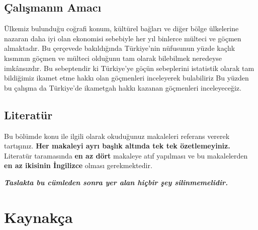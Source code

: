 \documentclass[
  12pt,
]{article}
\newlength{\cslhangindent}
\newlength{\cslentryspacingunit} %
\newenvironment{CSLReferences}[2] %
 {%
  \setlength{\parindent}{0pt}
  \ifodd #1
  \let\oldpar\par
  \def\par{\hangindent=\cslhangindent\oldpar}
  \fi
  \setlength{\parskip}{#2\cslentryspacingunit}
 }%
 {}
\begin{document}
\hypertarget{uxe7alux131ux15fmanux131n-amacux131}{%
\subsection{Çalışmanın Amacı}\label{uxe7alux131ux15fmanux131n-amacux131}}

Ülkemiz bulunduğu coğrafi konum, kültürel bağları ve diğer bölge ülkelerine nazaran daha
iyi olan ekonomisi sebebiyle her yıl binlerce mülteci ve göçmen almaktadır. Bu çerçevede
bakıldığında Türkiye'nin nüfusunun yüzde kaçlık kısmının göçmen ve mülteci olduğunu tam
olarak bilebilmek neredeyse imkânsızdır. Bu sebeptendir ki Türkiye'ye göçün sebeplerini
istatistik olarak tam bildiğimiz ikamet etme hakkı olan göçmenleri inceleyerek bulabiliriz Bu
yüzden bu çalışma da Türkiye'de ikametgah hakkı kazanan göçmenleri inceleyeceğiz.

\hypertarget{literatuxfcr}{%
\subsection{Literatür}\label{literatuxfcr}}

Bu bölümde konu ile ilgili olarak okuduğunuz makaleleri referans vererek tartışınız. \textbf{Her makaleyi ayrı başlık altında tek tek özetlemeyiniz.} Literatür taramasında \textbf{en az dört} makaleye atıf yapılması ve bu makalelerden \textbf{en az ikisinin İngilizce} olması gerekmektedir.

\textbf{\emph{Taslakta bu cümleden sonra yer alan hiçbir şey silinmemelidir.}}

\newpage

\hypertarget{references}{%
\section{Kaynakça}\label{references}}

\hypertarget{refs}{}
\begin{CSLReferences}{0}{0}
\end{CSLReferences}
\end{document}
